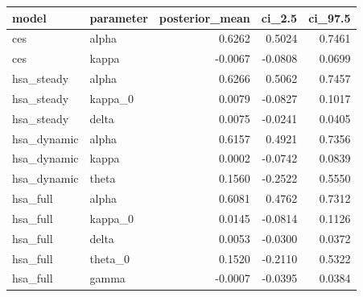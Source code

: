 \begin{tabular}{llrrr}
\toprule
model & parameter & posterior\_mean & ci\_2.5 & ci\_97.5 \\
\midrule
ces & alpha & 0.6262 & 0.5024 & 0.7461 \\
ces & kappa & -0.0067 & -0.0808 & 0.0699 \\
hsa\_steady & alpha & 0.6266 & 0.5062 & 0.7457 \\
hsa\_steady & kappa\_0 & 0.0079 & -0.0827 & 0.1017 \\
hsa\_steady & delta & 0.0075 & -0.0241 & 0.0405 \\
hsa\_dynamic & alpha & 0.6157 & 0.4921 & 0.7356 \\
hsa\_dynamic & kappa & 0.0002 & -0.0742 & 0.0839 \\
hsa\_dynamic & theta & 0.1560 & -0.2522 & 0.5550 \\
hsa\_full & alpha & 0.6081 & 0.4762 & 0.7312 \\
hsa\_full & kappa\_0 & 0.0145 & -0.0814 & 0.1126 \\
hsa\_full & delta & 0.0053 & -0.0300 & 0.0372 \\
hsa\_full & theta\_0 & 0.1520 & -0.2110 & 0.5322 \\
hsa\_full & gamma & -0.0007 & -0.0395 & 0.0384 \\
\bottomrule
\end{tabular}
